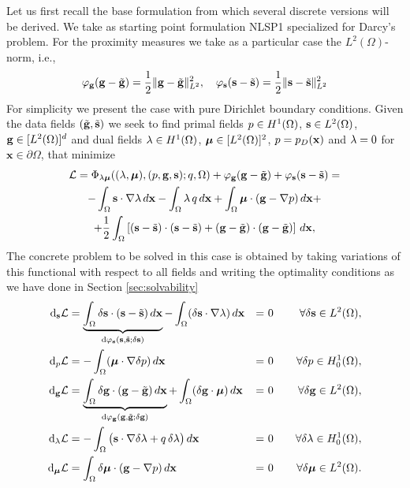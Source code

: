 Let us first recall the base formulation from which several discrete versions 
will be derived. We take as starting point formulation NLSP1 specialized for 
Darcy's problem. For the proximity measures we take as a particular
case the $L^2(\Omega)$-norm, i.e.,
$$
\varphi_{\mathbf{g}}(\mathbf{g} - \tilde{\mathbf{g}}) = \frac{1}{2}\|\mathbf{g}-\tilde{\mathbf{g}}\|^2_{L^2},~~~
\varphi_{\mathbf{s}}(\mathbf{s} - \tilde{\mathbf{s}}) = \frac{1}{2}\|\mathbf{s}-\tilde{\mathbf{s}}\|^2_{L^2}
$$
For simplicity we present the case with pure Dirichlet boundary conditions.
Given the data fields $(\tilde{\mathbf{g}}, \tilde{\mathbf{s}})$ we seek to
find primal fields
$p \in H^1(\Omega)$, $\mathbf{s} \in L^2(\Omega)$, $\mathbf{g} \in [L^2(\Omega)]^d$
and dual fields $\lambda \in H^1(\Omega)$, $\boldsymbol{\mu} \in [L^2(\Omega)]^2$,
$p = p_D(\mathbf{x})$ and $\lambda = 0$ for $\mathbf{x} \in \partial{\Omega}$,
that minimize
\begin{multline}
\mathcal{L} = \Phi_{\lambda \boldsymbol{\mu}}((\lambda, \boldsymbol{\mu}), (p, \mathbf{g}, \mathbf{s}); q, \Omega) +
\varphi_{\mathbf{g}}(\mathbf{g} - \tilde{\mathbf{g}}) + \varphi_{\mathbf{s}}(\mathbf{s} - \tilde{\mathbf{s}}) =  \\
- \int_{\Omega} \mathbf{s} \cdot \nabla \lambda \, d\mathbf{x} - \int_{\Omega} \lambda \, q \, d\mathbf{x} + \int_{\Omega} \boldsymbol{\mu} \cdot (\mathbf{g} -  \nabla p)\,d\mathbf{x}
+ \\
+ \frac{1}{2} \int_{\Omega} \left[ (\mathbf{s} - \tilde{\mathbf{s}}) \cdot (\mathbf{s} - \tilde{\mathbf{s}}) + (\mathbf{g} - \tilde{\mathbf{g}}) \cdot (\mathbf{g} - \tilde{\mathbf{g}}) \right] \, d\mathbf{x},
\end{multline}
The concrete problem to be solved in this case is obtained
by taking variations of this functional with respect to all fields
and writing the optimality conditions as we have done in Section \ref{sec:solvability}
\begin{equation*}
        \begin{aligned}
               \text{d}_{\mathbf{s}}\mathcal{L}  & = \underbrace{\int_{\Omega}  \delta \mathbf{s} \cdot (\mathbf{s} - \tilde{\mathbf{s}}) \, d\mathbf{x}}_{\text{d}\varphi_{\mathbf{s}}(\mathbf{s},\tilde{\mathbf{s}}; \delta{\mathbf{s}})} - \int_{\Omega}(\delta \mathbf{s} \cdot \nabla \lambda ) \, d\mathbf{x} & = & ~0 &\quad \forall \delta \mathbf{s} \in  L^2(\Omega), \\
                 \text{d}_{p}\mathcal{L} & = - \int_{\Omega}( \boldsymbol{\mu} \cdot  \nabla \delta p ) \, d\mathbf{x} & = & ~0 &\quad \forall \delta p \in H_0^1(\Omega), \\
                \text{d}_{\mathbf{g}}\mathcal{L} & = \underbrace{\int_{\Omega}  \delta \mathbf{g} \cdot (\mathbf{g} - \tilde{\mathbf{g}}) \, d\mathbf{x}}_{\text{d}\varphi_{\mathbf{g}}(\mathbf{g},\tilde{\mathbf{g}}; \delta{\mathbf{g}})}  + \int_{\Omega} (\delta \mathbf{g} \cdot \boldsymbol{\mu}) \, d\mathbf{x} & = & ~0 &\quad \forall \delta \mathbf{g} \in  L^2(\Omega), \\
                \text{d}_{\lambda}\mathcal{L} & = -\int_{\Omega} \big(\mathbf{s} \cdot \nabla \delta \lambda + q \, \delta \lambda \big) \, d\mathbf{x} & = & ~0 &\quad \forall \delta \lambda \in H_0^1(\Omega), \\
                \text{d}_{\boldsymbol{\mu}}\mathcal{L} & = \int_{\Omega} \delta \boldsymbol{\mu} \cdot (\mathbf{g} -  \nabla p) \, d\mathbf{x} & = & ~0 &\quad \forall \delta \boldsymbol{\mu} \in  L^2(\Omega).
        \end{aligned}
\end{equation*}
